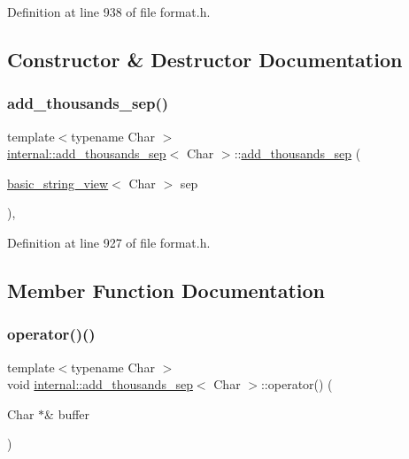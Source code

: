 Definition at line 938 of file format.\+h.



\subsection{Constructor \& Destructor Documentation}
\mbox{\label{classinternal_1_1add__thousands__sep_a87ae958dcd59c0191ac976ef70662827}} 
\subsubsection{\texorpdfstring{add\+\_\+thousands\+\_\+sep()}{add\_thousands\_sep()}}
{\footnotesize\ttfamily template$<$typename Char $>$ \\
\hyperlink{classinternal_1_1add__thousands__sep}{internal\+::add\+\_\+thousands\+\_\+sep}$<$ Char $>$\+::\hyperlink{classinternal_1_1add__thousands__sep}{add\+\_\+thousands\+\_\+sep} (\begin{DoxyParamCaption}\item[{\hyperlink{classbasic__string__view}{basic\+\_\+string\+\_\+view}$<$ Char $>$}]{sep }\end{DoxyParamCaption})\hspace{0.3cm}{\ttfamily [inline]}, {\ttfamily [explicit]}}



Definition at line 927 of file format.\+h.



\subsection{Member Function Documentation}
\mbox{\label{classinternal_1_1add__thousands__sep_a5a5f664cc8edbaccf37fbb1399366c5e}} 
\subsubsection{\texorpdfstring{operator()()}{operator()()}}
{\footnotesize\ttfamily template$<$typename Char $>$ \\
void \hyperlink{classinternal_1_1add__thousands__sep}{internal\+::add\+\_\+thousands\+\_\+sep}$<$ Char $>$\+::operator() (\begin{DoxyParamCaption}\item[{Char $\ast$\&}]{buffer }\end{DoxyParamCaption})\hspace{0.3cm}{\ttfamily [inline]}}



